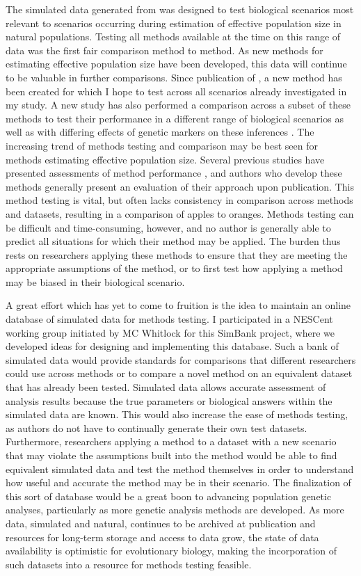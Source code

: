 The simulated data generated from  was designed to test biological scenarios most relevant to scenarios occurring during estimation of effective population size in natural populations. Testing all methods available at the time on this range of data was the first fair comparison method to method. As new methods for estimating effective population size have been developed, this data will continue to be valuable in further comparisons. Since publication of , a new method \citep{Hui:2015} has been created for which I hope to test across all scenarios already investigated in my study. A new study has also performed a comparison across a subset of these methods to test their performance in a different range of biological scenarios as well as with differing effects of genetic markers on these inferences \citep{Wang:2016}. The increasing trend of methods testing and comparison may be best seen for methods estimating effective population size. Several previous studies have presented assessments of method performance \citep{Ryman:2013, Neel:2013, Holleley:2013, Hoehn:2012, Barker:2011}, and authors who develop these methods generally present an evaluation of their approach upon publication. This method testing is vital, but often lacks consistency in comparison across methods and datasets, resulting in a comparison of apples to oranges. Methods testing can be difficult and time-consuming, however, and no author is generally able to predict all situations for which their method may be applied. The burden thus rests on researchers applying these methods to ensure that they are meeting the appropriate assumptions of the method, or to first test how applying a method may be biased in their biological scenario.

A great effort which has yet to come to fruition is the idea to maintain an online database of simulated data for methods testing. I participated in a NESCent working group initiated by MC Whitlock for this SimBank project, where we developed ideas for designing and implementing this database. Such a bank of simulated data would provide standards for comparisons that different researchers could use across methods or to compare a novel method on an equivalent dataset that has already been tested. Simulated data allows accurate assessment of analysis results because the true parameters or biological answers within the simulated data are known. This would also increase the ease of methods testing, as authors do not have to continually generate their own test datasets. Furthermore, researchers applying a method to a dataset with a new scenario that may violate the assumptions built into the method would be able to find equivalent simulated data and test the method themselves in order to understand how useful and accurate the method may be in their scenario. The finalization of this sort of database would be a great boon to advancing population genetic analyses, particularly as more genetic analysis methods are developed. As more data, simulated and natural, continues to be archived at publication and resources for long-term storage and access to data grow, the state of data availability is optimistic for evolutionary biology, making the incorporation of such datasets into a resource for methods testing feasible.

